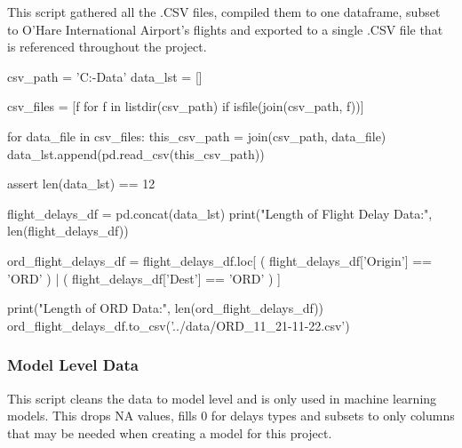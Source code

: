 \documentclass[a4paper,12pt]{article}
\begin{document}
This script gathered all the .CSV files, compiled them to one dataframe, subset to O'Hare International Airport's flights 
and exported to a single .CSV file that is referenced throughout the project.

\begin{python}
csv_path = 'C:\Code\school{}-Data\csvs'
data_lst = []

csv_files = [f for f in listdir(csv_path) if isfile(join(csv_path, f))]

for data_file in csv_files:
    this_csv_path = join(csv_path, data_file)
    data_lst.append(pd.read_csv(this_csv_path))

assert len(data_lst) == 12

flight_delays_df = pd.concat(data_lst)
print("Length of Flight Delay Data:", len(flight_delays_df))

ord_flight_delays_df = flight_delays_df.loc[ ( flight_delays_df['Origin'] == 'ORD' ) | ( flight_delays_df['Dest'] == 'ORD' ) ]

print("Length of ORD Data:", len(ord_flight_delays_df))
ord_flight_delays_df.to_csv('../data/ORD_11_21-11-22.csv')
\end{python}

\subsubsection{Model Level Data}

This script cleans the data to model level and is only used in machine learning models. This drops NA values, fills 0 for delays types and
subsets to only columns that may be needed when creating a model for this project.
\end{document}
